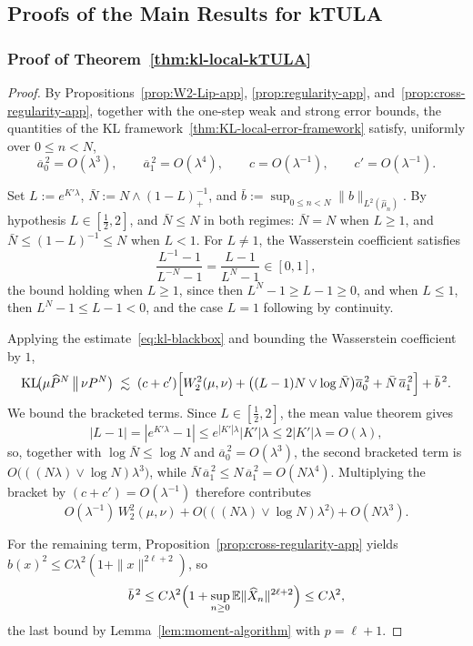 \documentclass[11pt,a4paper,reqno]{amsart}
\theoremstyle{plain}
\theoremstyle{definition}
\theoremstyle{remark}
\newcommand{\E}{\mathbb{E}}
\newcommand{\KL}{\mathrm{KL}}
\begin{document}
\subsection{Proofs of the Main Results for kTULA}



\subsubsection{Proof of Theorem~\ref{thm:kl-local-kTULA}}
\label{proof:kl-local-kTULA}
\begin{proof}
By Propositions~\ref{prop:W2-Lip-app}, \ref{prop:regularity-app},
and~\ref{prop:cross-regularity-app}, together with the one-step weak and strong
error bounds, the quantities of the KL framework~\ref{thm:KL-local-error-framework}
satisfy, uniformly over $0\le n<N$,
\[
  \overline a_0^{\,2}=O(\lambda^3),
  \qquad
  \overline a_1^{\,2}=O(\lambda^4),
  \qquad
  c=O(\lambda^{-1}),
  \qquad
  c'=O(\lambda^{-1}).
\]

Set $L:=e^{K'\lambda}$, $\bar N:=N\wedge(1-L)_+^{-1}$, and
$\bar b:=\sup_{0\le n<N}\|b\|_{L^2(\widehat\mu_n)}$. By hypothesis
$L\in[\tfrac12,2]$, and $\bar N\le N$ in both regimes: $\bar N=N$ when
$L\ge1$, and $\bar N\le(1-L)^{-1}\le N$ when $L<1$. For $L\neq1$, the
Wasserstein coefficient satisfies
\[
  \frac{L^{-1}-1}{L^{-N}-1}=\frac{L-1}{L^{N}-1}\in[0,1],
\]
the bound holding when $L\ge1$, since then $L^{N}-1\ge L-1\ge0$, and when
$L\le1$, then $L^{N}-1\le L-1<0$, and the case $L=1$ following by continuity.

Applying the estimate~\eqref{eq:kl-blackbox} and bounding the
Wasserstein coefficient by $1$,
\[
  \KL\!\bigl(\mu\widehat P^{N}\,\big\|\,\nu P^{N}\bigr)
  \;\lesssim\;
  (c+c')\Bigl[
    W_2^2(\mu,\nu)
    +\bigl((L-1)N\vee\log\bar N\bigr)\overline a_0^{\,2}
    +\bar N\,\overline a_1^{\,2}
  \Bigr]
  +\bar b^{\,2}.
\]
We bound the bracketed terms. Since $L\in[\tfrac12,2]$, the mean value theorem
gives
\[
  |L-1|=|e^{K'\lambda}-1|\le e^{|K'|\lambda}|K'|\lambda\le 2|K'|\lambda=O(\lambda),
\]
so, together with $\log\bar N\le\log N$ and $\overline a_0^{\,2}=O(\lambda^3)$,
the second bracketed term is $O\bigl(((N\lambda)\vee\log N)\lambda^3\bigr)$, while
$\bar N\,\overline a_1^{\,2}\le N\,\overline a_1^{\,2}=O(N\lambda^4)$.
Multiplying the bracket by $(c+c')=O(\lambda^{-1})$ therefore contributes
\[
  O(\lambda^{-1})\,W_2^2(\mu,\nu)
  +O\bigl(((N\lambda)\vee\log N)\lambda^2\bigr)
  +O(N\lambda^3).
\]

For the remaining term, Proposition~\ref{prop:cross-regularity-app} yields
$b(x)^2\le C\lambda^2(1+\|x\|^{2\ell+2})$, so
\[
  \bar b^{\,2}
  \le
  C\lambda^2\Bigl(1+\sup_{n\ge0}\E\|\widehat X_n\|^{2\ell+2}\Bigr)
  \le
  C\lambda^2,
\]
the last bound by Lemma~\ref{lem:moment-algorithm} with $p=\ell+1$.


\end{proof}
\end{document}

